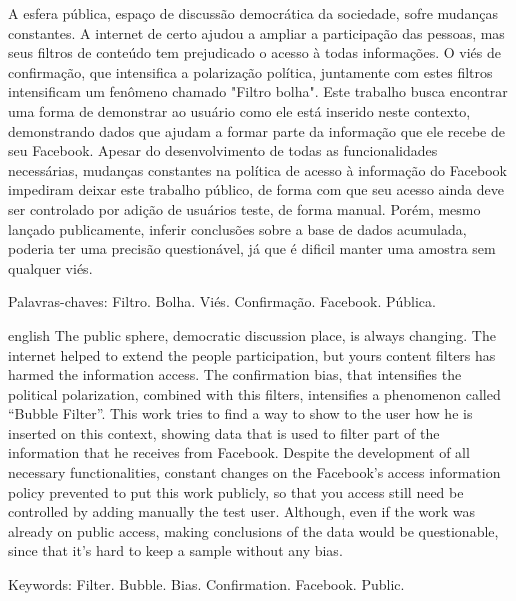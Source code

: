 \documentclass[
	12pt,				%
	oneside,			%
	a4paper,			%
	english,			%
	brazil				%
	]{abntex2ppgsi}
\begin{document}
\clearpage

\setlength{\absparsep}{18pt} %
\begin{resumo}

A esfera pública, espaço de discussão democrática da sociedade, sofre mudanças constantes. A internet de certo ajudou a ampliar a participação das pessoas, mas seus filtros de conteúdo tem prejudicado o acesso à todas informações. O viés de confirmação, que intensifica a polarização política, juntamente com estes filtros intensificam um fenômeno chamado "Filtro bolha". Este trabalho busca encontrar uma forma de demonstrar ao usuário como ele está inserido neste contexto, demonstrando dados que ajudam a formar parte da informação que ele recebe de seu Facebook. Apesar do desenvolvimento de todas as funcionalidades necessárias, mudanças constantes na política de acesso à informação do Facebook impediram deixar este trabalho público, de forma com que seu acesso ainda deve ser controlado por adição de usuários teste, de forma manual. Porém, mesmo lançado publicamente, inferir conclusões sobre a base de dados acumulada, poderia ter uma precisão questionável, já que é dificil manter uma amostra sem qualquer viés.

Palavras-chaves: Filtro. Bolha. Viés. Confirmação. Facebook. Pública. 
\end{resumo}

% 
% 
\begin{resumo}[Abstract]
\begin{otherlanguage*}{english}
The public sphere, democratic discussion place, is always changing. The internet helped to extend the people participation, but yours content filters has harmed the information access. The confirmation bias, that intensifies the political polarization, combined with this filters, intensifies a phenomenon called “Bubble Filter”. This work tries to find a way to show to the user how he is inserted on this context, showing data that is used to filter part of the information that he receives from Facebook. Despite the development of all necessary functionalities, constant changes on the Facebook’s access information policy prevented to put this work publicly, so that you access still need be controlled by adding manually the test user. Although, even if the work was already on public access, making conclusions of the data would be questionable, since that it’s hard to keep a sample without any bias. 

Keywords: Filter. Bubble. Bias. Confirmation. Facebook. Public.
\end{otherlanguage*}
\end{resumo}
\end{document}
